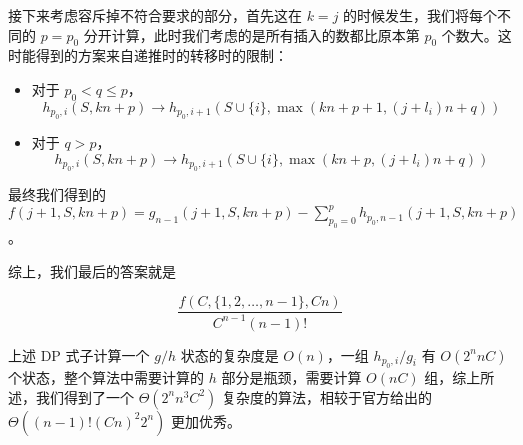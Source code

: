 \documentclass[12pt]{ctexart}
\begin{document}
接下来考虑容斥掉不符合要求的部分，首先这在 $k = j$ 的时候发生，我们将每个不同的 $p = p_0$ 分开计算，此时我们考虑的是所有插入的数都比原本第 $p_0$ 个数大。这时能得到的方案来自递推时的转移时的限制：

\begin{itemize}

\item 对于 $p_0 < q\le p$，
$$
h_{p_0, i}(S, kn + p) \rightarrow h_{p_0, i + 1}(S \cup \{i\}, \max(kn + p + 1, (j + l_i)n + q))
$$

\item 对于 $q > p$，
$$
h_{p_0, i}(S, kn + p) \rightarrow h_{p_0, i + 1}(S \cup \{i\}, \max(kn + p, (j + l_i)n + q))
$$

\end{itemize}

最终我们得到的 $f(j + 1, S, kn + p) = g_{n - 1}(j + 1, S, kn + p) - \sum_{p_0 = 0}^{p} h_{p_0, n - 1}(j + 1, S, kn + p)$。

综上，我们最后的答案就是

$$
\frac{f(C, \{1, 2, \dots, n - 1\}, Cn)}{C^{n - 1}(n - 1)!}
$$

上述 DP 式子计算一个 $g/h$ 状态的复杂度是 $O(n)$，一组 $h_{p_0, i}/g_i$ 有 $O(2^nnC)$ 个状态，整个算法中需要计算的 $h$ 部分是瓶颈，需要计算 $O(nC)$ 组，综上所述，我们得到了一个 $\Theta(2^n n^3 C^2)$ 复杂度的算法，相较于官方给出的 $\Theta((n-1)! (Cn)^2 2^n)$ 更加优秀。
\end{document}
